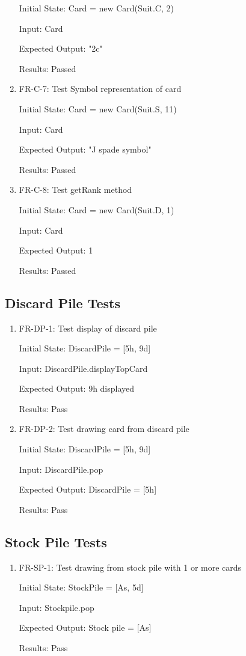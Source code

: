 \documentclass[12pt, titlepage]{article}
\begin{document}
\begin{enumerate}
    Initial State: Card = new Card(Suit.C, 2)
    					
    Input: Card
    					
    Expected Output: "2c"
    
    Results: Passed
    
    
    \item FR-C-7:  Test Symbol representation of card
    					
    Initial State: Card = new Card(Suit.S, 11)
    					
    Input: Card
    					
    Expected Output: "J spade symbol"
    
    Results: Passed
    
    
    \item FR-C-8: Test getRank method
    					
    Initial State: Card = new Card(Suit.D, 1)
    					
    Input: Card
    					
    Expected Output: 1
    
    Results: Passed

    
\end{enumerate}

\subsection{Discard Pile Tests}
\begin{enumerate}
    \item FR-DP-1: Test display of discard pile
    
    Initial State: DiscardPile = [5h, 9d]
    
    Input: DiscardPile.displayTopCard
    
    Expected Output: 9h displayed
    					
    Results: Pass
    
    \item FR-DP-2: Test drawing card from discard pile
    
    Initial State: DiscardPile = [5h, 9d]

    Input: DiscardPile.pop
        
    Expected Output: DiscardPile = [5h]
    					
    Results: Pass
\end{enumerate}

\subsection{Stock Pile Tests}
\begin{enumerate}
    \item FR-SP-1: Test drawing from stock pile with 1 or more cards
    
    Initial State: StockPile = [As, 5d]
    
    Input: Stockpile.pop
    
    Expected Output: Stock pile = [As]
    
    Results: Pass

\end{enumerate}
\end{document}
